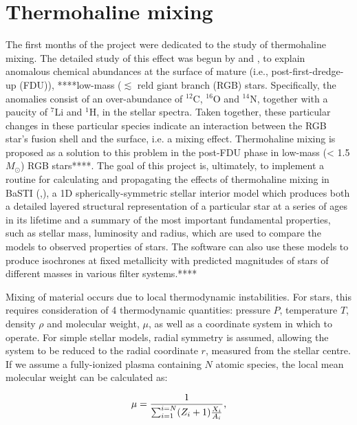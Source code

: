 \documentclass[12pt, a4paper]{report}
\begin{document}
\section{Thermohaline mixing}
The first months of the project were dedicated to the study of thermohaline mixing. The detailed study of this effect was begun by \cite{1972ApJ...172..165U} and \cite{1980A&A....91..175K}, to explain anomalous chemical abundances at the surface of mature (i.e., post-first-dredge-up (FDU)), ****low-mass ($\lesssim$ reld giant branch (RGB) stars. Specifically, the anomalies consist of an over-abundance of $^{12}$C, $^{16}$O and $^{14}$N, together with a paucity of $^{7}$Li and $^{1}$H, in the stellar spectra. Taken together, these particular changes in these particular species indicate an interaction between the RGB star's fusion shell and the surface, i.e. a mixing effect. Thermohaline mixing is proposed as a solution to this problem in the post-FDU phase in low-mass (< 1.5$M_{\odot}$) RGB stars****. The goal of this project is, ultimately, to implement a routine for calculating and propagating the effects of thermohaline mixing in BaSTI (\cite{2004ApJ...612..168P},\cite{2008ASPC..394..285P}), a 1D spherically-symmetric stellar interior model which produces both a detailed layered structural representation of a particular star at a series of ages in its lifetime and a summary of the most important fundamental properties, such as stellar mass, luminosity and radius, which are used to compare the models to observed properties of stars. The software can also use these models to produce isochrones at fixed metallicity \citep{2013A&A...558A..46P} with predicted magnitudes of stars of different masses in various filter systems.****

Mixing of material occurs due to local thermodynamic instabilities. For stars, this requires consideration of 4 thermodynamic quantities: pressure $P$, temperature $T$, density $\rho$ and molecular weight, $\mu$, as well as a coordinate system in which to operate. For simple stellar models, radial symmetry is assumed, allowing the system to be reduced to the radial coordinate $r$, measured from the stellar centre. If we assume a fully-ionized plasma containing $N$ atomic species, the local mean molecular weight can be calculated as:

\begin{equation}
\mu = \frac{1}{\sum_{i=1}^{i=N} (Z_{i}+1) \frac{X_{i}}{A_{i}}} \textnormal{,}
\label{mol_weight_def}
\end{equation}
\end{document}
